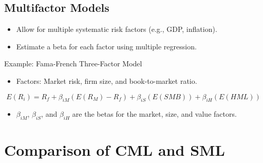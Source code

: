 \documentclass[
]{book}
\providecommand{\tightlist}{%
  \setlength{\itemsep}{0pt}\setlength{\parskip}{0pt}}
\begin{document}
\hypertarget{multifactor-models}{%
\subsection{Multifactor Models}\label{multifactor-models}}

\begin{itemize}
\tightlist
\item
  Allow for multiple systematic risk factors (e.g., GDP, inflation).
\item
  Estimate a beta for each factor using multiple regression.
\end{itemize}

Example: Fama-French Three-Factor Model

\begin{itemize}
\tightlist
\item
  Factors: Market risk, firm size, and book-to-market ratio.
\end{itemize}

\[
E(R_i) = R_f + \beta_{iM} (E(R_M) - R_f) + \beta_{iS} (E(SMB)) + \beta_{iH} (E(HML))
\]

\begin{itemize}
\tightlist
\item
  \(\beta_{iM}\), \(\beta_{iS}\), and \(\beta_{iH}\) are the betas for the market, size, and value factors.
\end{itemize}

\hypertarget{comparison-of-cml-and-sml}{%
\section{Comparison of CML and SML}\label{comparison-of-cml-and-sml}}
\end{document}
